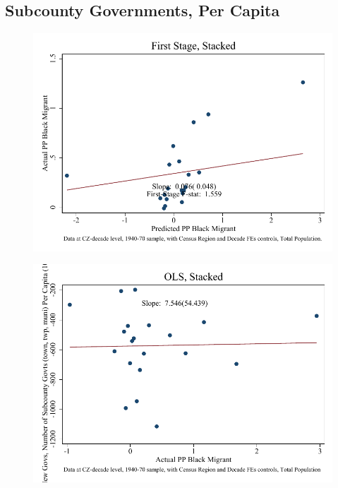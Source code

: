 \documentclass{article}
\begin{document}
\subsection{Subcounty Governments, Per Capita}

\clearpage
\begin{figure}
\centering
\includegraphics{figures/simplefigs/stacked_gen_subcounty_pc_C3_total_fs.pdf}
\end{figure}
\clearpage
\begin{figure}
\centering
\includegraphics{figures/simplefigs/stacked_gen_subcounty_pc_C3_total_ols.pdf}
\end{figure}
\clearpage
\end{document}
